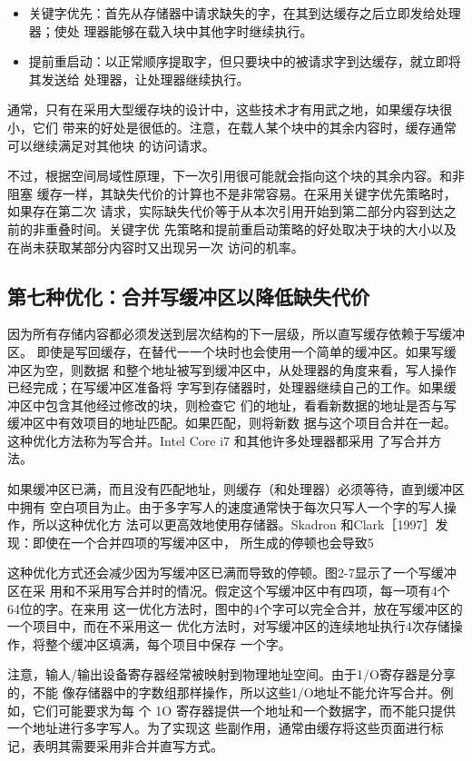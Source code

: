 \begin{itemize}
    \item 关键字优先：首先从存储器中请求缺失的字，在其到达缓存之后立即发给处理器；使处
    理器能够在载入块中其他字时继续执行。
    \item 提前重启动：以正常顺序提取字，但只要块中的被请求字到达缓存，就立即将其发送给
    处理器，让处理器继续执行。
\end{itemize}

通常，只有在采用大型缓存块的设计中，这些技术才有用武之地，如果缓存块很小，它们
带来的好处是很低的。注意，在载人某个块中的其余内容时，缓存通常可以继续满足对其他块
的访问请求。

不过，根据空间局域性原理，下一次引用很可能就会指向这个块的其余内容。和非阻塞
缓存一样，其缺失代价的计算也不是非常容易。在采用关键字优先策略时，如果存在第二次
请求，实际缺失代价等于从本次引用开始到第二部分内容到达之前的非重叠时间。关键字优
先策略和提前重启动策略的好处取决于块的大小以及在尚未获取某部分内容时又出现另一次
访问的机率。

\subsection{第七种优化：合并写缓冲区以降低缺失代价}

因为所有存储内容都必须发送到层次结构的下一层级，所以直写缓存依赖于写缓冲区。
即使是写回缓存，在替代一一个块时也会使用一个简单的缓冲区。如果写缓冲区为空，则数据
和整个地址被写到缓冲区中，从处理器的角度来看，写人操作已经完成；在写缓冲区准备将
字写到存储器时，处理器继续自己的工作。如果缓冲区中包含其他经过修改的块，则检查它
们的地址，看看新数据的地址是否与写缓冲区中有效项目的地址匹配。如果匹配，则将新数
据与这个项目合并在一起。这种优化方法称为写合并。Intel Core i7 和其他许多处理器都采用
了写合并方法。

如果缓冲区已满，而且没有匹配地址，则缓存（和处理器）必须等待，直到缓冲区中拥有
空白项目为止。由于多字写人的速度通常快于每次只写人一个字的写人操作，所以这种优化方
法可以更高效地使用存储器。Skadron 和Clark［1997］发现：即使在一个合并四项的写缓冲区中，
所生成的停顿也会导致5%

这种优化方式还会减少因为写缓冲区已满而导致的停顿。图2-7显示了一个写缓冲区在采
用和不采用写合并时的情况。假定这个写缓冲区中有四项，每一项有4个 64位的字。在来用
这一优化方法时，图中的4个字可以完全合并，放在写缓冲区的一个项目中，而在不采用这一
优化方法时，对写缓冲区的连续地址执行4次存储操作，将整个缓冲区填满，每个项目中保存
一个字。

注意，输人/输出设备寄存器经常被映射到物理地址空间。由于1/O寄存器是分享的，不能
像存储器中的字数组那样操作，所以这些1/O地址不能允许写合并。例如，它们可能要求为每
个 1O 寄存器提供一个地址和一个数据字，而不能只提供一个地址进行多字写人。为了实现这
些副作用，通常由缓存将这些页面进行标记，表明其需要采用非合并直写方式。


